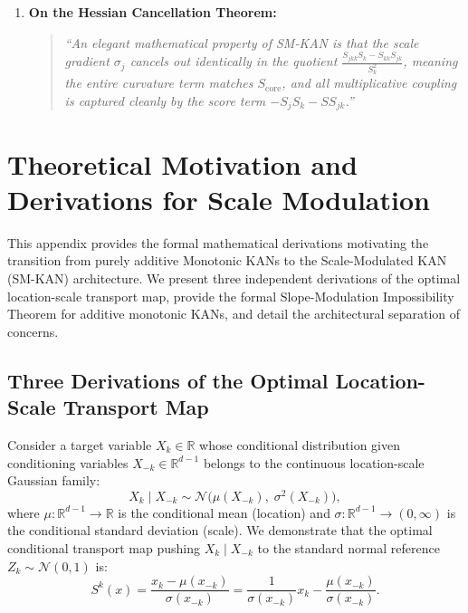 \documentclass[11pt,a4paper]{article}
\theoremstyle{plain}
\theoremstyle{definition}
\theoremstyle{remark}
\begin{document}
\begin{enumerate}
    \item \textbf{On the Hessian Cancellation Theorem:}
    \begin{quote}
    \textit{``An elegant mathematical property of SM-KAN is that the scale gradient $\sigma_j$ cancels out identically in the quotient $\frac{S_{jkk} S_k - S_{kk} S_{jk}}{S_k^2}$, meaning the entire curvature term matches $S_{\text{core}}$, and all multiplicative coupling is captured cleanly by the score term $-S_j S_k - S S_{jk}$.''}
    \end{quote}
\end{enumerate}

\appendix
\section{Theoretical Motivation and Derivations for Scale Modulation}

This appendix provides the formal mathematical derivations motivating the transition from purely additive Monotonic KANs to the Scale-Modulated KAN (SM-KAN) architecture. We present three independent derivations of the optimal location-scale transport map, provide the formal Slope-Modulation Impossibility Theorem for additive monotonic KANs, and detail the architectural separation of concerns.

\subsection{Three Derivations of the Optimal Location-Scale Transport Map}

Consider a target variable $X_k \in \mathbb{R}$ whose conditional distribution given conditioning variables $X_{-k} \in \mathbb{R}^{d-1}$ belongs to the continuous location-scale Gaussian family:
\begin{equation}
    X_k \mid X_{-k} \sim \mathcal{N}\Big( \mu(X_{-k}), \; \sigma^2(X_{-k}) \Big),
\end{equation}
where $\mu: \mathbb{R}^{d-1} \to \mathbb{R}$ is the conditional mean (location) and $\sigma: \mathbb{R}^{d-1} \to (0, \infty)$ is the conditional standard deviation (scale). We demonstrate that the optimal conditional transport map pushing $X_k \mid X_{-k}$ to the standard normal reference $Z_k \sim \mathcal{N}(0, 1)$ is:
\begin{equation}
    S^k(x) = \frac{x_k - \mu(x_{-k})}{\sigma(x_{-k})} = \frac{1}{\sigma(x_{-k})} x_k - \frac{\mu(x_{-k})}{\sigma(x_{-k})}.
    \label{eq:app_ideal_map}
\end{equation}
\end{document}
